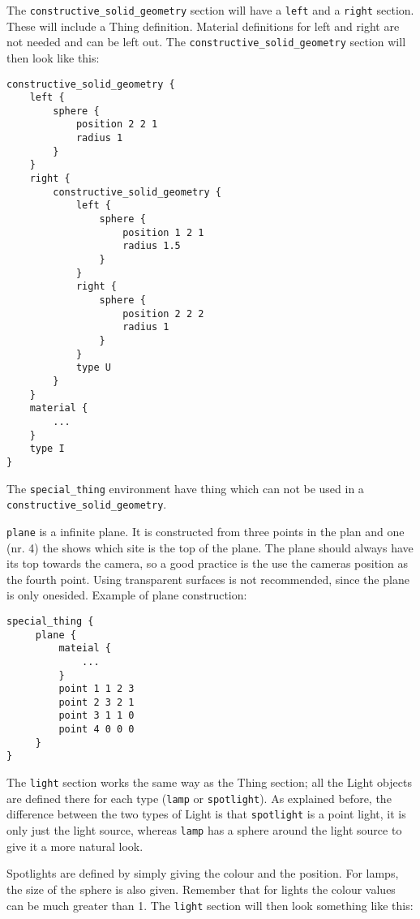 The \texttt{constructive\_solid\_geometry} section will have a \texttt{left} and a \texttt{right} section. These will include a Thing definition. Material definitions for left and right are not needed and can be left out. The \texttt{constructive\_solid\_geometry} section will then look like this:

\begin{verbatim}
constructive_solid_geometry {
    left {
        sphere {
            position 2 2 1
            radius 1
        }
    }
    right {
        constructive_solid_geometry {
            left {
                sphere {
                    position 1 2 1
                    radius 1.5
                }
            }
            right {
                sphere {
                    position 2 2 2
                    radius 1
                }
            }
            type U
        }
    }
    material {
        ...
    }
    type I
}
\end{verbatim}

The \texttt{special\_thing} environment have thing which can not be used in a \texttt{constructive\_solid\_geometry}.

\texttt{plane} is a infinite plane. It is constructed from three points in the plan and one (nr. 4) the shows which site is the top of the plane. The plane should always have its top towards the camera, so a good practice is the use the cameras position as the fourth point. Using transparent surfaces is not recommended, since the plane is only onesided. Example of plane construction:

\begin{verbatim}
special_thing {
     plane {
         mateial {
             ...
         }
         point 1 1 2 3
         point 2 3 2 1
         point 3 1 1 0
         point 4 0 0 0
     }
}
\end{verbatim}

The \texttt{light} section works the same way as the Thing section; all the Light objects are defined there for each type (\texttt{lamp} or \texttt{spotlight}). As explained before, the difference between the two types of Light is that \texttt{spotlight} is a point light, it is only just the light source, whereas \texttt{lamp} has a sphere around the light source to give it a more natural look.

Spotlights are defined by simply giving the colour and the position. For lamps, the size of the sphere is also given. Remember that for lights the colour values can be much greater than 1. The \texttt{light} section will then look something like this:

